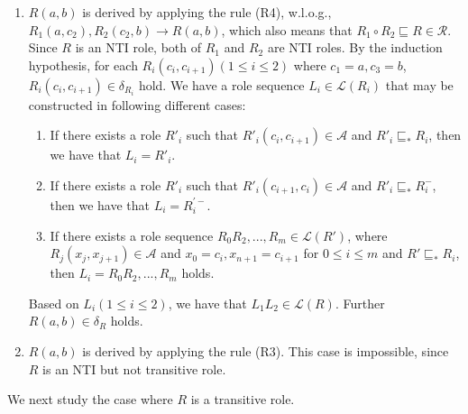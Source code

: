 \documentclass[final,1p,times]{elsarticle}
\begin{document}
\begin{enumerate}[leftmargin=12ex,label=Case~1.\arabic*, ref=Case~1.\arabic*]
\item $R(a,b)$ is derived by applying the rule (R4), w.l.o.g.,
    $R_1(a,c_2),R_2(c_2,b)\rightarrow R(a,b)$,
    which also means that $R_1\circ R_2\sqsubseteq R\in\mathcal{R}$.
    Since $R$ is an NTI role, both of $R_1$ and $R_2$ are NTI roles. By the induction hypothesis,
    for each $R_i(c_i,c_{i+1})(1\leq i\leq 2)$ where $c_1=a, c_3=b$, $R_i(c_i,c_{i+1})\in\delta_{R_i}$
    hold. We have a role sequence $L_i\in\mathcal{L}(R_i)$ that may be constructed in following different cases:

    \begin{enumerate}[leftmargin=14ex,label=Case~1.3.\arabic*]
    \item If there exists a role $R'_i$ such that $R'_i(c_i,c_{i+1})\in\mathcal{A}$
        and $R'_i\sqsubseteq_* R_i$, then we have that $L_i=R'_i$.

    \item If there exists a role $R'_i$ such that $R'_i(c_{i+1},c_{i})\in\mathcal{A}$
        and $R'_i\sqsubseteq_* R_i^-$, then we have that $L_i=R^{'-}_i$.

    \item If there exists a role sequence $R_0R_2,...,R_m\in\mathcal{L}(R')$, where $R_j(x_j,x_{j+1})\in\mathcal{A}$ and $x_0=c_i, x_{n+1}=c_{i+1}$ for $0\leq i\leq m$
        and $R'\sqsubseteq_* R_i$, then $L_i=R_0R_2,...,R_m$ holds.
    \end{enumerate}

    Based on $L_i(1\leq i\leq 2)$, we have that $L_1L_2\in\mathcal{L}(R)$. Further $R(a,b)\in\delta_R$
    holds.\label{dhlplus:NTIcaseR4}

\item $R(a,b)$ is derived by applying the rule (R3). This case is impossible,
    since $R$ is an NTI but not transitive role.
\end{enumerate}

We next study the case where $R$ is a transitive role.
\end{document}
